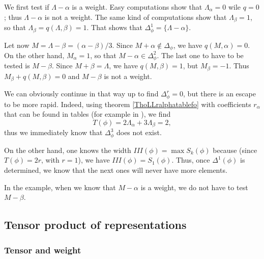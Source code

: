 We first test if $\Lambda-\alpha$ is a weight. Easy computations show that  $\Lambda_{\alpha}=0$ wile $q=0$; thus $\Lambda-\alpha$ is not a weight. The same kind of computations show that $\Lambda_{\beta}=1$, so that $\Lambda_{\beta}=q(\Lambda,\beta)=1$. That shows that $\Delta_{\phi}^1=\{ \Lambda-\alpha \}$.

Let now $M=\Lambda-\beta=(\alpha-\beta)/3$. Since $M+\alpha\notin\Delta_{\phi}$, we have $q(M,\alpha)=0$. On the other hand, $M_{\alpha}=1$, so that $M-\alpha\in\Delta_{\phi}^2$. The last one to have to be tested is $M-\beta$. Since $M+\beta=\Lambda$, we have $q(M,\beta)=1$, but $M_{\beta}=-1$. Thus $M_{\beta}+q(M,\beta)=0$ and $M-\beta$ is not a weight.

We can obviously continue in that way up to find $\Delta_{\phi}^r=0$, but there is an escape to be more rapid. Indeed, using theorem \ref{ThoLLralphatablefo} with coefficients $r_{\alpha}$ that can be found in tables (for example in \cite{Wybourne}), we find 
\begin{equation}
    T(\phi)=2\Lambda_{\alpha}+3\Lambda_{\beta}=2,
\end{equation}
thus we immediately know that $\Delta^3_{\phi}$ does not exist.

On the other hand, one knows the width $III(\phi)=\max S_k(\phi)$ because (since $T(\phi)=2r$, with $r=1$), we have $III(\phi)=S_1(\phi)$. Thus, once $\Delta^1(\phi)$ is determined, we know that the next ones will never have more elements.

In the example, when we know that $M-\alpha$ is a weight, we do not have to test $M-\beta$.

\label{LeTravail}

                    \subsection{Tensor product of representations}

                    \subsubsection{Tensor and weight}


